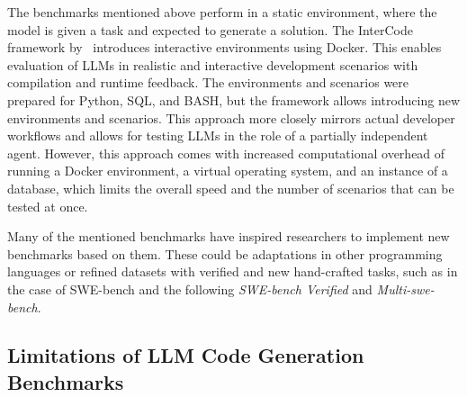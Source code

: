 The benchmarks mentioned above perform in a static environment, where the model is given a task and expected to generate a solution.
The InterCode framework by~\cite{yang2023intercodestandardizingbenchmarkinginteractive} introduces interactive environments using Docker.
This enables evaluation of LLMs in realistic and interactive development scenarios with compilation and runtime feedback.
The environments and scenarios were prepared for Python, SQL, and BASH, but the framework allows introducing new environments and scenarios.
This approach more closely mirrors actual developer workflows and allows for testing LLMs in the role of a partially independent agent.
However, this approach comes with increased computational overhead of running a Docker environment, a virtual operating system, and an instance of a database, which limits the overall speed and the number of scenarios that can be tested at once.

Many of the mentioned benchmarks have inspired researchers to implement new benchmarks based on them. These could be adaptations in other programming languages or refined datasets with verified and new hand-crafted tasks, such as in the case of SWE-bench and the following \textit{SWE-bench Verified} and \textit{Multi-swe-bench}.




\subsection{Limitations of LLM Code Generation Benchmarks}



